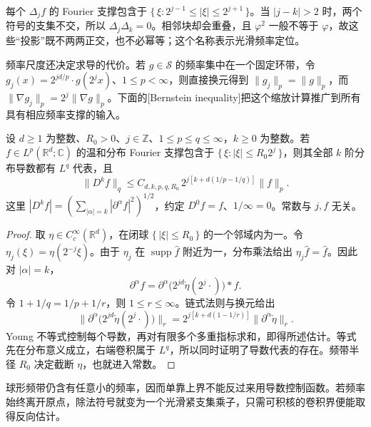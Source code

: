 每个 \(\Delta_jf\) 的 Fourier 支撑包含于 \(\{\,\xi:2^{j-1}\leq|\xi|\leq2^{j+1}\,\}\)。当 \(|j-k|>2\) 时，两个符号的支集不交，所以 \(\Delta_j\Delta_k=0\)。相邻块却会重叠，且 \(\varphi^2\) 一般不等于 \(\varphi\)，故这些“投影”既不两两正交，也不必幂等；这个名称表示光滑频率定位。

\ProseParagraphBreak

频率尺度还决定求导的代价。若 \(g\in\mathcal S\) 的频率集中在一个固定环带，令 \(g_j(x)=2^{jd/p}\cdot g(2^jx)\)、\(1\leq p<\infty\)，则直接换元得到 \(\|g_j\|_p=\|g\|_p\)，而 \(\|\nabla g_j\|_p=2^j\|\nabla g\|_p\)。下面的[Bernstein inequality]把这个缩放计算推广到所有具有相应频率支撑的输入。

\begin{proposition}[Bernstein 估计]\label{b2:thm:19-bernstein}
设 \(d\geq1\) 为整数、\(R_0>0\)、\(j\in\mathbb Z\)、\(1\leq p\leq q\leq\infty\)，\(k\geq0\) 为整数。若 \(f\in L^p(\mathbb R^d;\mathbb C)\) 的温和分布 Fourier 支撑包含于 \(\{\,\xi:|\xi|\leq R_0 2^j\,\}\)，则其全部 \(k\) 阶分布导数都有 \(L^q\) 代表，且
\[
 \|D^kf\|_q
 \leq C_{d,k,p,q,R_0}\,2^{j[k+d(1/p-1/q)]}\|f\|_p.
\]
这里 \(|D^kf|=(\sum_{|\alpha|=k}|\partial^\alpha f|^2)^{1/2}\)，约定 \(D^0f=f\)、\(1/\infty=0\)。常数与 \(j,f\) 无关。
\end{proposition}
\begin{proof}
取 \(\eta\in C_c^\infty(\mathbb R^d)\)，在闭球 \(\{\,|\xi|\leq R_0\,\}\) 的一个邻域内为一。令 \(\eta_j(\xi)=\eta(2^{-j}\xi)\)。由于 \(\eta_j\) 在 \(\operatorname{supp}\widehat f\) 附近为一，分布乘法给出 \(\eta_j\widehat f=\widehat f\)。因此对 \(|\alpha|=k\)，
\[
 \partial^\alpha f
 =\partial^\alpha\bigl(2^{jd}\check\eta(2^j\cdot)\bigr)*f.
\]
令 \(1+1/q=1/p+1/r\)，则 \(1\leq r\leq\infty\)。链式法则与换元给出
\[
 \bigl\|\partial^\alpha
       \bigl(2^{jd}\check\eta(2^j\cdot)\bigr)\bigr\|_r
 =2^{j[k+d(1-1/r)]}\|\partial^\alpha\check\eta\|_r.
\]
Young 不等式控制每个导数，再对有限多个多重指标求和，即得所述估计。等式先在分布意义成立，右端卷积属于 \(L^q\)，所以同时证明了导数代表的存在。频带半径 \(R_0\) 决定截断 \(\eta\)，也就进入常数。
\end{proof}

球形频带仍含有任意小的频率，因而单靠上界不能反过来用导数控制函数。若频率始终离开原点，除法符号就变为一个光滑紧支集乘子，只需可积核的卷积界便能取得反向估计。

